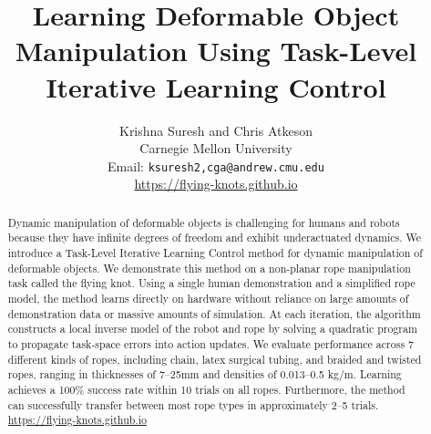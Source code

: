 \documentclass[conference]{IEEEtran}
\begin{document}
\title{Learning Deformable Object Manipulation Using Task-Level Iterative Learning Control}

\author{Krishna Suresh and Chris Atkeson\\
	Carnegie Mellon University\\
	Email: \texttt{{ksuresh2,cga}@andrew.cmu.edu}\\
\url{https://flying-knots.github.io}
}


\maketitle

\begin{abstract}
   Dynamic manipulation of deformable objects is challenging for humans and robots because they have infinite degrees of freedom and exhibit underactuated dynamics.
   We introduce a Task-Level Iterative Learning Control method for dynamic manipulation of deformable objects. We demonstrate this method on a non-planar rope manipulation task called the flying knot. Using a single human demonstration and a simplified rope model, the method learns directly on hardware without reliance on large amounts of demonstration data or massive amounts of simulation. At each iteration, the algorithm constructs a local inverse model of the robot and rope by solving a quadratic program to propagate task-space errors into action updates. We evaluate performance across 7 different kinds of ropes, including chain, latex surgical tubing, and braided and twisted ropes, ranging in thicknesses of 7--25mm and densities of 0.013--0.5 kg/m. Learning achieves a 100\% success rate within 10 trials on all ropes. Furthermore, the method can successfully transfer between most rope types in approximately 2--5 trials. \url{https://flying-knots.github.io}
\end{abstract}

\IEEEpeerreviewmaketitle
\end{document}
